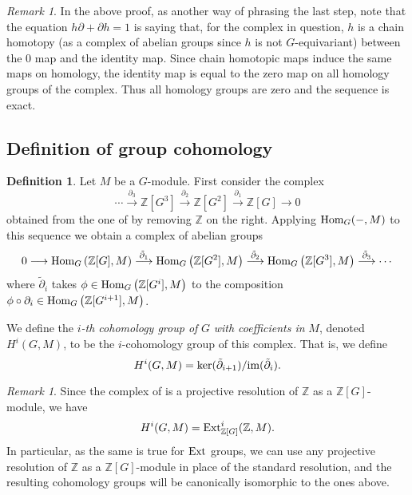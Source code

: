 \documentclass[11pt]{amsart}
\numberwithin{equation}{section}
\theoremstyle{remark}
\newtheorem{remark}[equation]{Remark}
\theoremstyle{remark}
\theoremstyle{remark}
\theoremstyle{definition}
\theoremstyle{definition}
\theoremstyle{definition}
\newtheorem{defi}[equation]{Definition}
\theoremstyle{definition}
\theoremstyle{definition}
\theoremstyle{definition}
\begin{document}
\begin{remark}
In the above proof, as another way of phrasing the last step, note that the equation $h\partial+\partial h=1$ is saying that, for the complex in question, $h$ is a chain homotopy (as a complex of abelian groups since $h$ is not $G$-equivariant) between the $0$ map and the identity map. Since chain homotopic maps induce the same maps on homology, the identity map is equal to the zero map on all homology groups of the complex. Thus all homology groups are zero and the sequence is exact.
\end{remark}

\subsection{Definition of group cohomology}

\begin{defi}
Let $M$ be a $G$-module. First consider the complex 
\[\cdots \stackrel{\partial_3}{\longrightarrow} \mathbb{Z}[G^3] \stackrel{\partial_{2}}{\longrightarrow} \mathbb{Z}[G^2] \stackrel{\partial_1}{\longrightarrow} \mathbb{Z}[G] \longrightarrow 0\]
obtained from the one of  by removing $\mathbb{Z}$ on the right. Applying $\textup{Hom}_{G}(-,M)$ to this sequence we obtain a complex of abelian groups
\[0\longrightarrow \textup{Hom}_{G}\left(\mathbb{Z}[G],M\right)\stackrel{\tilde{\partial}_1}{\longrightarrow}\textup{Hom}_{G}\left(\mathbb{Z}[G^2],M\right)\stackrel{\tilde{\partial}_2}{\longrightarrow}\textup{Hom}_{G}\left(\mathbb{Z}[G^3],M\right)\stackrel{\tilde{\partial}_3}{\longrightarrow} \cdots\] 
where $\tilde{\partial}_i$ takes $\phi \in \textup{Hom}_{G}\left(\mathbb{Z}[G^i],M\right)$ to the composition $\phi \circ \partial_i \in \textup{Hom}_{G}\left(\mathbb{Z}[G^{i+1}],M\right)$.

We define the $i$\textit{-th cohomology group of }$G$\textit{ with coefficients in }$M$, denoted $H^i(G,M)$, to be the $i$-cohomology group of this complex. That is, we define
\[H^i(G,M)=\ker(\tilde{\partial}_{i+1})/\textup{im}(\tilde{\partial}_i).\]
\end{defi}

\begin{remark} \label{ext indep of resolution}
Since the complex of  is a projective resolution of $\mathbb{Z}$ as a $\mathbb{Z}[G]$-module, we have
\[H^i(G,M)=\textup{Ext}_{\mathbb{Z}[G]}^i(\mathbb{Z},M).\]
In particular, as the same is true for $\textup{Ext}$ groups, we can use any projective resolution of $\mathbb{Z}$ as a $\mathbb{Z}[G]$-module in place of the standard resolution, and the resulting cohomology groups will be canonically isomorphic to the ones above.
\end{remark}
\end{document}
